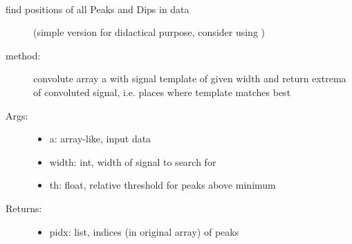 \documentclass[letterpaper,10pt,english]{sphinxmanual}
\begin{document}

\begin{fulllineitems}
\label{\detokenize{index:PhyPraKit.PhyPraKit.convolutionPeakfinder}}~\begin{description}
\item[{find positions of all Peaks and Dips in data }] \leavevmode
(simple version for didactical purpose, 
consider using  )

\item[{method: }] \leavevmode
convolute array a with signal template of given width and
return extrema of convoluted signal, i.e. places where 
template matches best

\item[{Args:}] \leavevmode\begin{itemize}
\item {} 
a: array-like, input data

\item {} 
width: int, width of signal to search for

\item {} 
th: float, relative threshold for peaks above minimum

\end{itemize}

\item[{Returns:}] \leavevmode\begin{itemize}
\item {} 
pidx: list, indices (in original array) of peaks

\end{itemize}

\end{description}

\end{fulllineitems}

\end{document}
